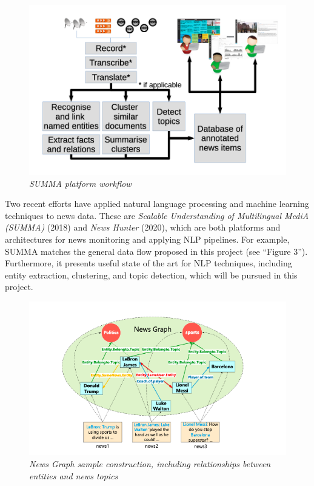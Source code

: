 \documentclass[11pt]{article}
\begin{document}
  \begin{figure}
    \centerline{\includegraphics[scale=0.4]{literature-review--summa.png}}
    \caption{\textit{SUMMA platform workflow}}
  \end{figure}

  Two recent efforts have applied natural language processing and machine learning techniques to news data. These are \textit{Scalable Understanding of Multilingual MediA (SUMMA)} \cite{germann2018integrating} (2018) and \textit{News Hunter} \cite{berven2020knowledge} (2020), which are both platforms and architectures for news monitoring and applying NLP pipelines. For example, SUMMA matches the general data flow proposed in this project (see ``Figure 3''). Furthermore, it presents useful state of the art for NLP techniques, including entity extraction, clustering, and topic detection, which will be pursued in this project.

  \begin{figure}
    \centerline{\includegraphics[scale=0.4]{literature-review--newsgraph.png}}
    \caption{\textit{News Graph sample construction, including relationships between entities and news topics}}
  \end{figure}
\end{document}
